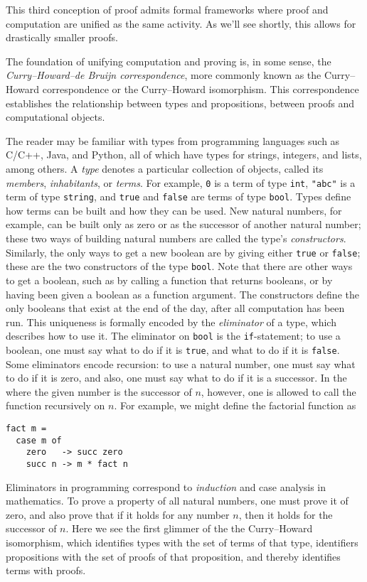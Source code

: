 This third conception of proof admits formal frameworks where proof and computation are unified as the same activity.
As we'll see shortly, this allows for drastically smaller proofs.

The foundation of unifying computation and proving is, in some sense, the \emph{Curry--Howard--de Bruijn correspondence}, more commonly known as the Curry--Howard correspondence or the Curry--Howard isomorphism.
This correspondence establishes the relationship between types and propositions, between proofs and computational objects.

The reader may be familiar with types from programming languages such as C/C++, Java, and Python, all of which have types for strings, integers, and lists, among others.
A \emph{type} denotes a particular collection of objects, called its \emph{members}, \emph{inhabitants}, or \emph{terms}.
For example, \texttt{0} is a term of type \texttt{int}, \verb|"abc"| is a term of type \texttt{string}, and \texttt{true} and \texttt{false} are terms of type \texttt{bool}.
Types define how terms can be built and how they can be used.
New natural numbers, for example, can be built only as zero or as the successor of another natural number; these two ways of building natural numbers are called the type's \emph{constructors}.
Similarly, the only ways to get a new boolean are by giving either \texttt{true} or \texttt{false}; these are the two constructors of the type \texttt{bool}.
Note that there are other ways to get a boolean, such as by calling a function that returns booleans, or by having been given a boolean as a function argument.
The constructors define the only booleans that exist at the end of the day, after all computation has been run.
This uniqueness is formally encoded by the \emph{eliminator} of a type, which describes how to use it.
The eliminator on \texttt{bool} is the \texttt{if}-statement; to use a boolean, one must say what to do if it is \texttt{true}, and what to do if it is \texttt{false}.
Some eliminators encode recursion: to use a natural number, one must say what to do if it is zero, and also, one must say what to do if it is a successor.
In the where the given number is the successor of $n$, however, one is allowed to call the function recursively on $n$.
For example, we might define the factorial function as
\begin{verbatim}
fact m =
  case m of
    zero   -> succ zero
    succ n -> m * fact n
\end{verbatim}

Eliminators in programming correspond to \emph{induction} and case analysis in mathematics.
To prove a property of all natural numbers, one must prove it of zero, and also prove that if it holds for any number $n$, then it holds for the successor of $n$.
Here we see the first glimmer of the the Curry--Howard isomorphism, which identifies types with the set of terms of that type, identifiers propositions with the set of proofs of that proposition, and thereby identifies terms with proofs.

